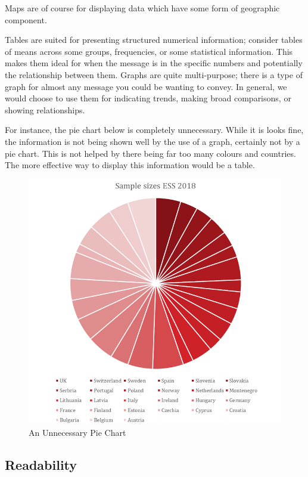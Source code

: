 \documentclass[
  titlepage]{book}
\begin{document}
Maps are of course for displaying data which have some form of geographic component.

Tables are suited for presenting structured numerical information; consider tables of means across some groups, frequencies, or some statistical information. This makes them ideal for when the message is in the specific numbers and potentially the relationship between them.
Graphs are quite multi-purpose; there is a type of graph for almost any message you could be wanting to convey. In general, we would choose to use them for indicating trends, making broad comparisons, or showing relationships.

For instance, the pie chart below is completely unnecessary. While it is looks fine, the information is not being shown well by the use of a graph, certainly not by a pie chart. This is not helped by there being far too many colours and countries. The more effective way to display this information would be a table.

\begin{figure}
\centering
\includegraphics{img/Bad pie chart.png}
\caption{An Unnecessary Pie Chart}
\end{figure}

\hypertarget{readability}{%
\subsection{Readability}\label{readability}}
\end{document}
